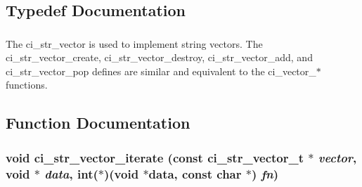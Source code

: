 \subsection{Typedef Documentation}
\hypertarget{group__STR__VECTORS_ga6b0d497303a6f84dd117722d0d3d5458}{
\subsubsection[{ci\_\-str\_\-vector\_\-t}]{}}
\label{group__STR__VECTORS_ga6b0d497303a6f84dd117722d0d3d5458}


The ci\_\-str\_\-vector is used to implement string vectors. The ci\_\-str\_\-vector\_\-create, ci\_\-str\_\-vector\_\-destroy, ci\_\-str\_\-vector\_\-add, and ci\_\-str\_\-vector\_\-pop defines are similar and equivalent to the ci\_\-vector\_\-$\ast$ functions. 

\subsection{Function Documentation}
\hypertarget{group__STR__VECTORS_gacce606c651cf5cf8726027c2bb170faf}{
\subsubsection[{ci\_\-str\_\-vector\_\-iterate}]{\setlength{\rightskip}{0pt plus 5cm}void ci\_\-str\_\-vector\_\-iterate (const {\bf ci\_\-str\_\-vector\_\-t} $\ast$ {\em vector}, \/  void $\ast$ {\em data}, \/  int($\ast$)(void $\ast$data, const char $\ast$) {\em fn})}}
\label{group__STR__VECTORS_gacce606c651cf5cf8726027c2bb170faf}


